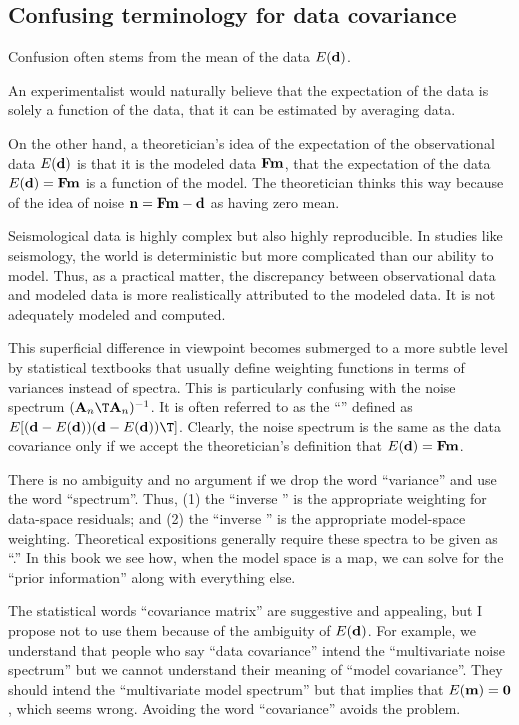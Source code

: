 \subsection{Confusing terminology for data covariance}
Confusion often stems from the mean of the data $E(\bold d)$.
\par
An experimentalist would naturally believe that
the expectation of the data
is solely a function of the data,
that it can be estimated by averaging data.
\par
On the other hand, a theoretician's idea
of the expectation of the observational data $E(\bold d)$
is that it is the modeled data $\bold F\bold m$,
that the expectation of the data
$E(\bold d)=\bold F\bold m $ is a function of the model.
The theoretician thinks this way because of the idea
of noise $\bold n=\bold F\bold m-\bold d$ as having zero mean.
\par
Seismological data is highly complex but also highly reproducible.
In studies like seismology,
the world is deterministic but more complicated than our ability to model.
Thus, as a practical matter,
the discrepancy between observational data and modeled data
is more realistically attributed to the modeled data.
It is not adequately modeled and computed.
\par
This superficial difference in viewpoint becomes submerged
to a more subtle level
by statistical textbooks that usually define weighting functions
in terms of variances instead of spectra.
This is particularly confusing with the noise spectrum
$(\bold A_n\T \bold A_n)^{-1}$.
It is often referred to as the ``''
defined as $E[(\bold d-E(\bold d))(\bold d-E(\bold d))\T]$.
Clearly, the noise spectrum is the same as the data covariance
only if we accept the theoretician's definition
that $E(\bold d)=\bold F\bold m$.
\par
There is no ambiguity and no argument
if we drop the word ``variance'' and use the word ``spectrum''.
Thus,
(1) the ``inverse ''
is the appropriate weighting for data-space residuals;
and (2) the ``inverse ''
is the appropriate model-space weighting.
Theoretical expositions generally require
these spectra to be given as ``.''
In this book we see how,
when the model space is a map,
we can solve for the ``prior information''
along with everything else.

\par
The statistical words ``covariance matrix'' are suggestive and appealing,
but I propose not to use them
because of the ambiguity of $E(\bold d)$.
For example, we understand that people who say ``data covariance''
intend the ``multivariate noise spectrum''
but we cannot understand their meaning of ``model covariance''.
They should intend the ``multivariate model spectrum''
but that implies that $E(\bold m)=\bold 0$,
which seems wrong.
Avoiding the word ``covariance'' avoids the problem.

